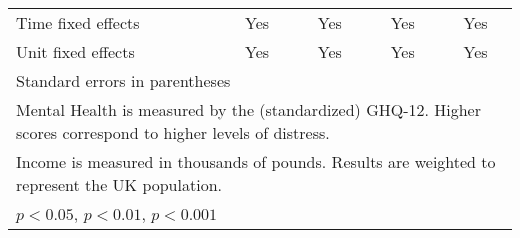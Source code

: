 {\begin{longtable}{l*{4}{c}}
Time fixed effects&      Yes         &      Yes         &      Yes         &      Yes         \\
Unit fixed effects&      Yes         &      Yes         &      Yes         &      Yes         \\
\bottomrule
\multicolumn{5}{l}{\footnotesize Standard errors in parentheses}\\
\multicolumn{5}{l}{\footnotesize Mental Health is measured by the (standardized) GHQ-12. Higher scores correspond to higher levels of distress.}\\
\multicolumn{5}{l}{\footnotesize Income is measured in thousands of pounds. Results are weighted to represent the UK population.}\\
\multicolumn{5}{l}{\footnotesize \sym{*} \(p<0.05\), \sym{**} \(p<0.01\), \sym{***} \(p<0.001\)}\\
\end{longtable}
}
